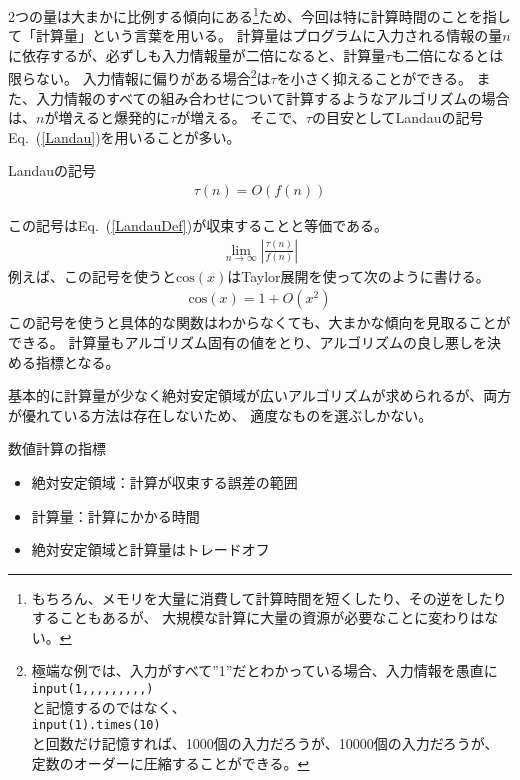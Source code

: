 \documentclass[autodetect-engine,dvipdfmx-if-dvi,ja=standard,a4paper,layout=v2]{bxjsreport}
\newcommand{\eref}[1]{Eq.~(\ref{#1})}
\begin{document}
    2つの量は大まかに比例する傾向にある\footnote{
      もちろん、メモリを大量に消費して計算時間を短くしたり、その逆をしたりすることもあるが、
      大規模な計算に大量の資源が必要なことに変わりはない。
    }ため、今回は特に計算時間のことを指して「計算量」という言葉を用いる。
    計算量はプログラムに入力される情報の量$n$に依存するが、必ずしも入力情報量が二倍になると、計算量$\tau$も二倍になるとは限らない。
    入力情報に偏りがある場合\footnote{
      極端な例では、入力がすべて”1”だとわかっている場合、入力情報を愚直に\\
      \texttt{input(1,,,,,,,,,)}\\
      と記憶するのではなく、\\
      \texttt{input(1).times(10)}\\
      と回数だけ記憶すれば、1000個の入力だろうが、10000個の入力だろうが、
      定数のオーダーに圧縮することができる。
    }は$\tau$を小さく抑えることができる。
    また、入力情報のすべての組み合わせについて計算するようなアルゴリズムの場合は、$n$が増えると爆発的に$\tau$が増える。
    そこで、$\tau$の目安としてLandauの記号\eref{Landau}を用いることが多い。
    \begin{itembox}[l]{Landauの記号}
      \begin{align}
        \tau(n) = O(f(n)) \label{Landau}
      \end{align}
    \end{itembox}
    この記号は\eref{LandauDef}が収束することと等価である。
    \begin{align}
      \lim_{n\to\infty}\left|\frac{\tau(n)}{f(n)}\right| \label{LandauDef}
    \end{align}
    例えば、この記号を使うと$\mathrm{cos}(x)$はTaylor展開を使って次のように書ける。
    \begin{align}
      \mathrm{cos}(x) = 1 + O(x^{2})
    \end{align}
    この記号を使うと具体的な関数はわからなくても、大まかな傾向を見取ることができる。
    計算量もアルゴリズム固有の値をとり、アルゴリズムの良し悪しを決める指標となる。\par
    基本的に計算量が少なく絶対安定領域が広いアルゴリズムが求められるが、両方が優れている方法は存在しないため、
    適度なものを選ぶしかない。
    \begin{itembox}[l]{数値計算の指標}
      \begin{itemize}
        \item 絶対安定領域：計算が収束する誤差の範囲
        \item 計算量：計算にかかる時間
        \item 絶対安定領域と計算量はトレードオフ
      \end{itemize}
    \end{itembox}
\newpage
\end{document}
